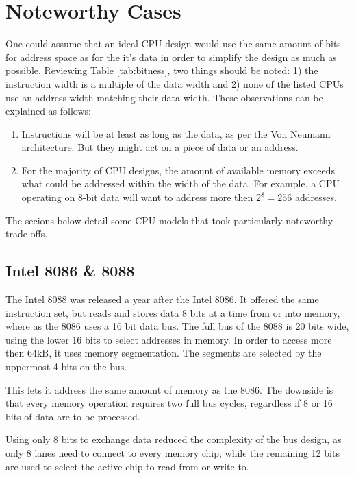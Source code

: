 \documentclass[twoside,twocolumn]{article}
\begin{document}

\section{Noteworthy Cases}

One could assume that an ideal CPU design would use the same amount of bits for address
space as for the it's data in order to simplify the design as much as possible. Reviewing
Table \ref{tab:bitness}, two things should be noted: 1) the instruction width is a
multiple of the data width and 2) none of the listed CPUs use an address width matching
their data width. These observations can be explained as follows:

\begin{enumerate}[1)]
\item Instructions will be at least as long as the data, as per the Von Neumann
architecture. But they might act on a piece of data or an address.
\item For the majority of CPU designs, the amount of available memory exceeds what could
be addressed within the width of the data. For example, a CPU operating on 8-bit data
will want to address more then $2^8 = 256$ addresses.
\end{enumerate}

The secions below detail some CPU models that took particularly noteworthy trade-offs.

\subsection{Intel 8086 \& 8088}

The Intel 8088 was released a year after the Intel 8086. It offered the same instruction
set, but reads and stores data 8 bits at a time from or into memory, where as the 8086
uses a 16 bit data bus. The full bus of the 8088 is 20 bits wide, using the lower 16 bits
to select addresses in memory. In order to access more then 64kB, it uses memory
segmentation. The segments are selected by the uppermost 4 bits on the bus.

This lets it address the same amount of memory as the 8086. The downside is that every
memory operation requires two full bus cycles, regardless if 8 or 16 bits of data are
to be processed.

Using only 8 bits to exchange data reduced the complexity of the bus design, as only 8
lanes need to connect to every memory chip, while the remaining 12 bits are used to
select the active chip to read from or write to.
\end{document}
